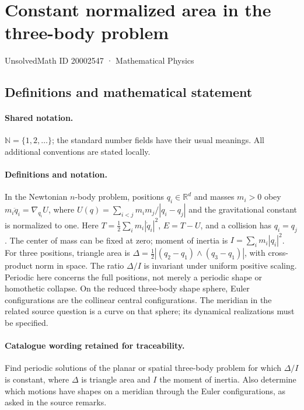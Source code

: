 \documentclass[11pt]{article}
\begin{document}
\setcounter{section}{20002546}
\section{Constant normalized area in the three-body problem}\label{20002547}
{\small UnsolvedMath ID 20002547 · Mathematical Physics}
\subsection{Definitions and mathematical statement}

\paragraph{Shared notation.}$\mathbb N=\{1,2,\ldots\}$; the standard number fields have their usual meanings. All additional conventions are stated locally.


\paragraph{Definitions and notation.}In the Newtonian $n$-body problem, positions $q_i\in\mathbb R^d$ and masses $m_i>0$ obey $m_i\ddot q_i=\nabla_{q_i}U$, where $U(q)=\sum_{i<j}m_im_j/|q_i-q_j|$ and the gravitational constant is normalized to one. Here $T=\tfrac12\sum_i m_i|\dot q_i|^2$, $E=T-U$, and a collision has $q_i=q_j$. The center of mass can be fixed at zero; moment of inertia is $I=\sum_i m_i|q_i|^2$. For three positions, triangle area is $\Delta=\tfrac12|(q_2-q_1)\wedge(q_3-q_1)|$, with cross-product norm in space. The ratio $\Delta/I$ is invariant under uniform positive scaling. Periodic here concerns the full positions, not merely a periodic shape or homothetic collapse. On the reduced three-body shape sphere, Euler configurations are the collinear central configurations. The meridian in the related source question is a curve on that sphere; its dynamical realizations must be specified.

\paragraph{Catalogue wording retained for traceability.}
Find periodic solutions of the planar or spatial three-body problem for which $\Delta/I$ is constant, where $\Delta$ is triangle area and $I$ the moment of inertia. Also determine which motions have shapes on a meridian through the Euler configurations, as asked in the source remarks.
\end{document}
